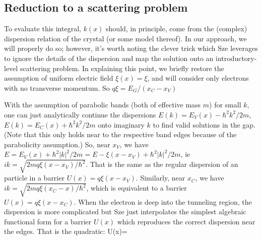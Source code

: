 \subsection{Reduction to a scattering problem}
To evaluate this integral, $k(x)$ should, in principle, come from the (complex) dispersion relation of the crystal (or some model thereof).  In our approach, we will properly do so; however, it's worth noting the clever trick which Sze leverages to ignore the details of the dispersion and map the solution onto an introductory-level scattering problem.  In explaining this point, we briefly restore the assumption of uniform electric field $\xi(x)=\xi$, and will consider only electrons with no transverse momentum.  So $q\xi=E_G/(x_C-x_V)$

With the assumption of parabolic bands (both of effective mass $m$) for small $k$, one can just analytically continue the dispersions $E(k)=E_V(x)-\hbar^2k^2/2m$, $E(k)=E_C(x)+\hbar^2k^2/2m$ onto imaginary $k$ to find valid solutions in the gap.  (Note that this only holds near to the respective band edges because of the parabolicity assumption.)  So, near $x_V$, we have $E=E_V(x)+\hbar^2|k|^2/2m=E-\xi(x-x_V)+\hbar^2|k|^2/2m$, ie $ik=\sqrt{2mq\xi(x-x_V)/\hbar^2}$.  That is the same as the regular dispersion of an particle in a barrier $U(x)=q\xi(x-x_V)$.  Similarly, near $x_C$, we have $ik=\sqrt{2mq\xi(x_C-x)/\hbar^2}$, which is equivalent to a barrier $U(x)=q\xi(x-x_C)$.  When the electron is deep into the tunneling region, the dispersion is more complicated but Sze just interpolates the simplest algebraic functional form for a barrier $U(x)$ which reproduces the correct dispersion near the edges.  That is the quadratic:
$$U(x)=